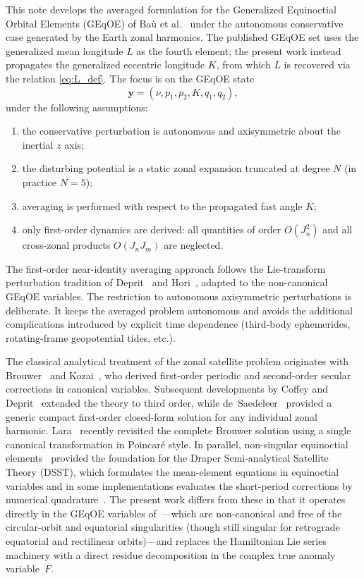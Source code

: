\documentclass[11pt]{article}
\begin{document}
This note develops the averaged formulation for the Generalized Equinoctial
Orbital Elements (GEqOE) of Ba\`u et al.~\cite{bau2021} under the autonomous
conservative case generated by the Earth zonal harmonics. The published GEqOE
set uses the generalized mean longitude $L$ as the fourth element; the present
work instead propagates the generalized eccentric longitude $K$, from which $L$
is recovered via the relation \eqref{eq:L_def}. The focus is on
the GEqOE state
\begin{equation}
\bm{y} = (\nu,p_1,p_2,K,q_1,q_2),
\end{equation}
under the following assumptions:
\begin{enumerate}
    \item the conservative perturbation is autonomous and axisymmetric about the
    inertial $z$ axis;
    \item the disturbing potential is a static zonal expansion truncated at
    degree $N$ (in practice $N = 5$);
    \item averaging is performed with respect to the propagated fast angle $K$;
    \item only first-order dynamics are derived: all quantities of order
    $O(J_n^2)$ and all cross-zonal products $O(J_n J_m)$ are neglected.
\end{enumerate}

The first-order near-identity averaging approach follows the Lie-transform
perturbation tradition of Deprit~\cite{deprit1969} and
Hori~\cite{hori1966}, adapted to the non-canonical GEqOE variables.
The restriction to autonomous axisymmetric perturbations is deliberate. It
keeps the averaged problem autonomous and avoids the additional complications
introduced by explicit time dependence (third-body ephemerides,
rotating-frame geopotential tides, etc.).

The classical analytical treatment of the zonal satellite problem originates
with Brouwer~\cite{brouwer1959} and Kozai~\cite{kozai1959}, who derived
first-order periodic and second-order secular corrections in canonical
variables. Subsequent developments by Coffey and Deprit~\cite{coffey1982}
extended the theory to third order, while
de~Saedeleer~\cite{desaedeleer2005} provided a generic compact first-order
closed-form solution for any individual zonal harmonic.
Lara~\cite{lara2021} recently revisited the complete Brouwer solution using
a single canonical transformation in Poincar\'e style. In parallel,
non-singular equinoctial elements~\cite{broucke1972,cefola1972} provided the
foundation for the Draper Semi-analytical Satellite Theory (DSST), which
formulates the mean-element equations in equinoctial variables and in some
implementations evaluates the short-period corrections by numerical
quadrature~\cite{sanjuan2022}. The present work differs from these in that
it operates directly in the GEqOE variables of~\cite{bau2021}---which are
non-canonical and free of the circular-orbit and equatorial singularities
(though still singular for retrograde equatorial and rectilinear
orbits)---and replaces the Hamiltonian Lie series machinery with a direct
residue decomposition in the complex true anomaly variable~$F$.
\end{document}
